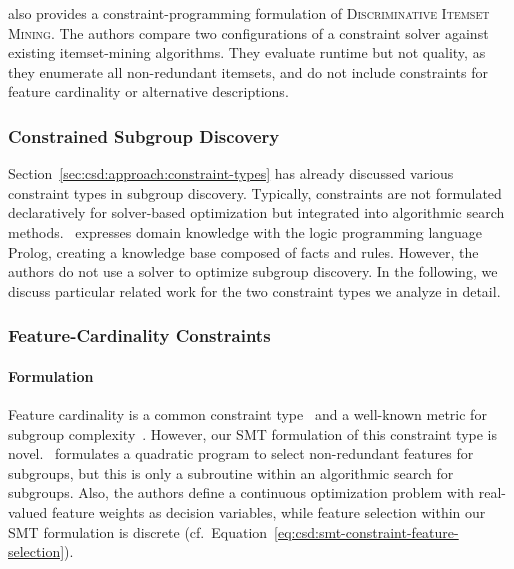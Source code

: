 \documentclass{article}
\theoremstyle{definition}
\begin{document}
\cite{guns2011itemset} also provides a constraint-programming formulation of \textsc{Discriminative Itemset Mining}.
The authors compare two configurations of a constraint solver against existing itemset-mining algorithms.
They evaluate runtime but not quality, as they enumerate all non-redundant itemsets, and do not include constraints for feature cardinality or alternative descriptions.

\subsubsection{Constrained Subgroup Discovery}
\label{sec:csd:related-work:subgroup-discovery:constraints}

Section~\ref{sec:csd:approach:constraint-types} has already discussed various constraint types in subgroup discovery.
Typically, constraints are not formulated declaratively for solver-based optimization but integrated into algorithmic search methods.
\cite{atzmueller2007using}~expresses domain knowledge with the logic programming language Prolog, creating a knowledge base composed of facts and rules.
However, the authors do not use a solver to optimize subgroup discovery.
In the following, we discuss particular related work for the two constraint types we analyze in detail.

\subsubsection{Feature-Cardinality Constraints}
\label{sec:csd:related-work:subgroup-discovery:cardinality}

\paragraph{Formulation}

Feature cardinality is a common constraint type~\cite{meeng2021real} and a well-known metric for subgroup complexity~\cite{helal2016subgroup, herrera2011overview, ventura2018subgroup}.
However, our SMT formulation of this constraint type is novel.
\cite{li2015efficient}~formulates a quadratic program to select non-redundant features for subgroups, but this is only a subroutine within an algorithmic search for subgroups.
Also, the authors define a continuous optimization problem with real-valued feature weights as decision variables, while feature selection within our SMT formulation is discrete (cf.~Equation~\ref{eq:csd:smt-constraint-feature-selection}).
\end{document}
